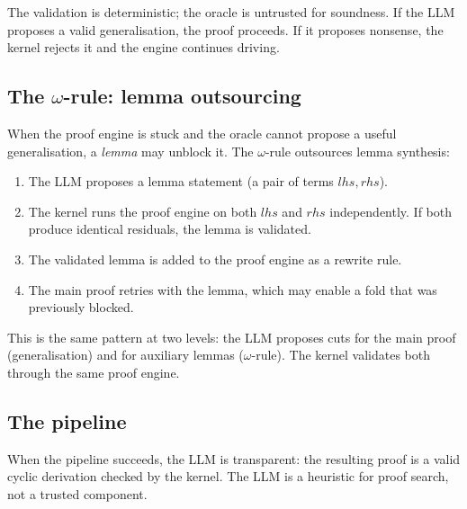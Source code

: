 The validation is deterministic; the oracle is untrusted for soundness.
If the LLM proposes a valid generalisation, the proof proceeds.  If it
proposes nonsense, the kernel rejects it and the engine continues driving.

\subsection{The $\omega$-rule: lemma outsourcing}

When the proof engine is stuck and the oracle cannot propose a useful
generalisation, a \emph{lemma} may unblock it.  The $\omega$-rule outsources
lemma synthesis:

\begin{enumerate}[leftmargin=*]
\item The LLM proposes a lemma statement (a pair of terms $\mathit{lhs},
  \mathit{rhs}$).
\item The kernel runs the proof engine on both $\mathit{lhs}$ and $\mathit{rhs}$
  independently.  If both produce identical residuals, the lemma is validated.
\item The validated lemma is added to the proof engine as a rewrite rule.
\item The main proof retries with the lemma, which may enable a fold that was
  previously blocked.
\end{enumerate}

This is the same pattern at two levels: the LLM proposes cuts for the main
proof (generalisation) and for auxiliary lemmas ($\omega$-rule).  The kernel
validates both through the same proof engine.

\subsection{The pipeline}

\begin{center}
\end{center}

When the pipeline succeeds, the LLM is transparent: the resulting proof is
a valid cyclic derivation checked by the kernel.  The LLM is a heuristic for
proof search, not a trusted component.
